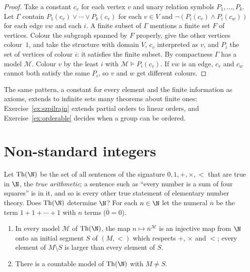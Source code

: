 \begin{proof}
Take a constant $c_v$ for each vertex $v$ and unary relation symbols $P_1,\dots,P_k$. Let $\Gamma$ contain $P_1(c_v)\lor\cdots\lor P_k(c_v)$ for each $v\in V$ and $\neg(P_i(c_v)\land P_i(c_w))$ for each edge $vw$ and each $i$. A finite subset of $\Gamma$ mentions a finite set $F$ of vertices. Colour the subgraph spanned by $F$ properly, give the other vertices colour~$1$, and take the structure with domain $V$, $c_v$ interpreted as $v$, and $P_i$ the set of vertices of colour $i$: it satisfies the finite subset. By compactness $\Gamma$ has a model $\mathcal M$. Colour $v$ by the least $i$ with $\mathcal M\models P_i(c_v)$. If $vw$ is an edge, $c_v$ and $c_w$ cannot both satisfy the same $P_i$, so $v$ and $w$ get different colours.
\end{proof}

The same pattern, a constant for every element and the finite information as axioms, extends to infinite sets many theorems about finite ones: Exercise~\ref{ex:szpilrajn} extends partial orders to linear orders, and Exercise~\ref{ex:orderable} decides when a group can be ordered.

\section{Non-standard integers}\label{sec:nonstandard}

Let $\mathrm{Th}(\N)$ be the set of all sentences of the signature $0,1,+,\times,<$ that are true in $\N$, the \emph{true arithmetic}; a sentence such as ``every number is a sum of four squares'' is in it, and so is every other true statement of elementary number theory. Does $\mathrm{Th}(\N)$ determine $\N$? For each $n\in\N$ let the numeral $\overline n$ be the term $1+1+\cdots+1$ with $n$ terms ($\overline0=0$).

\begin{theorem}[Skolem, 1933]\label{thm:nonstandard}
\begin{enumerate}
\item In every model $\mathcal M$ of $\mathrm{Th}(\N)$, the map $n\mapsto\overline n^{\mathcal M}$ is an injective map from $\N$ onto an initial segment $S$ of $(M,<)$ which respects $+$, $\times$ and $<$; every element of $M\setminus S$ is larger than every element of $S$.
\item There is a countable model of $\mathrm{Th}(\N)$ with $M\ne S$.
\end{enumerate}
\end{theorem}

